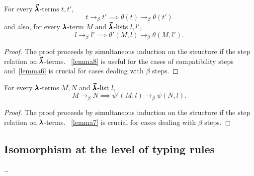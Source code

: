 \begin{theorem}
  \label{theorem7}
  For every $\pmb{\vec \lambda}$-terms $t, t'$,
  \[ t \to_{\beta} t' \implies \theta(t) \to_{\beta} \theta(t') \]
  and also, for every $\pmb{\lambda}$-term $M$ and $\pmb{\vec \lambda}$-lists $l, l'$,
  \[ l \to_{\beta} l' \implies \theta'(M, l) \to_{\beta} \theta(M, l'). \]
\end{theorem}
\begin{proof}
  The proof proceeds by simultaneous induction on the structure if the step relation on $\pmb{\vec \lambda}$-terms.
  ~\cref{lemma8} is useful for the cases of compatibility steps and~\cref{lemma6} is crucial for cases dealing with $\beta$ steps.
\end{proof}


\begin{theorem}
  \label{theorem8}
  For every $\pmb{\lambda}$-terms $M, N$ and $\pmb{\vec \lambda}$-list $l$,
  \[ M \to_{\beta} N \implies \psi'(M, l) \to_{\beta} \psi(N, l). \]
\end{theorem}
\begin{proof}
  The proof proceeds by simultaneous induction on the structure if the step relation on $\pmb{\lambda}$-terms.
  ~\cref{lemma7} is crucial for cases dealing with $\beta$ steps.
\end{proof}

\subsection{Isomorphism at the level of typing rules}

\dots

